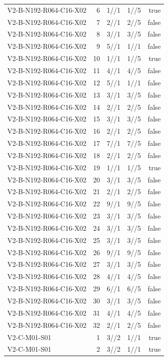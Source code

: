 {\begin{longtable}{lrrrr}
V2-B-N192-R064-C16-X02 & 6 & 1//1 & 1//5 & true \\
V2-B-N192-R064-C16-X02 & 7 & 2//1 & 2//5 & false \\
V2-B-N192-R064-C16-X02 & 8 & 3//1 & 3//5 & false \\
V2-B-N192-R064-C16-X02 & 9 & 5//1 & 1//1 & false \\
V2-B-N192-R064-C16-X02 & 10 & 1//1 & 1//5 & true \\
V2-B-N192-R064-C16-X02 & 11 & 4//1 & 4//5 & false \\
V2-B-N192-R064-C16-X02 & 12 & 5//1 & 1//1 & false \\
V2-B-N192-R064-C16-X02 & 13 & 3//1 & 3//5 & false \\
V2-B-N192-R064-C16-X02 & 14 & 2//1 & 2//5 & false \\
V2-B-N192-R064-C16-X02 & 15 & 3//1 & 3//5 & false \\
V2-B-N192-R064-C16-X02 & 16 & 2//1 & 2//5 & false \\
V2-B-N192-R064-C16-X02 & 17 & 7//1 & 7//5 & false \\
V2-B-N192-R064-C16-X02 & 18 & 2//1 & 2//5 & false \\
V2-B-N192-R064-C16-X02 & 19 & 1//1 & 1//5 & true \\
V2-B-N192-R064-C16-X02 & 20 & 3//1 & 3//5 & false \\
V2-B-N192-R064-C16-X02 & 21 & 2//1 & 2//5 & false \\
V2-B-N192-R064-C16-X02 & 22 & 9//1 & 9//5 & false \\
V2-B-N192-R064-C16-X02 & 23 & 3//1 & 3//5 & false \\
V2-B-N192-R064-C16-X02 & 24 & 3//1 & 3//5 & false \\
V2-B-N192-R064-C16-X02 & 25 & 3//1 & 3//5 & false \\
V2-B-N192-R064-C16-X02 & 26 & 9//1 & 9//5 & false \\
V2-B-N192-R064-C16-X02 & 27 & 3//1 & 3//5 & false \\
V2-B-N192-R064-C16-X02 & 28 & 4//1 & 4//5 & false \\
V2-B-N192-R064-C16-X02 & 29 & 6//1 & 6//5 & false \\
V2-B-N192-R064-C16-X02 & 30 & 3//1 & 3//5 & false \\
V2-B-N192-R064-C16-X02 & 31 & 4//1 & 4//5 & false \\
V2-B-N192-R064-C16-X02 & 32 & 2//1 & 2//5 & false \\
V2-C-M01-S01 & 1 & 3//2 & 1//1 & true \\
V2-C-M01-S01 & 2 & 3//2 & 1//1 & true \\

\end{longtable}}
